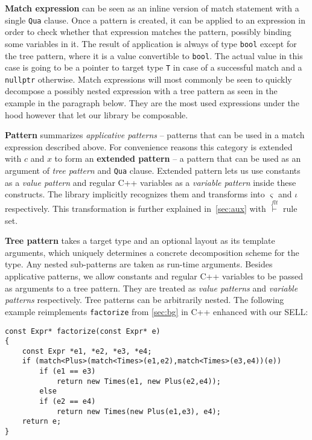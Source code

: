 \documentclass[preprint]{sigplanconf}
\makeatletter
\DeclareRobustCommand{\code}[1]{{\lstinline[breaklines=false,escapechar=@]{#1}}}
\makeatother
\begin{document}
{\bf Match expression} can be seen as an inline version of match statement with 
a single \code{Qua} clause. Once a pattern is created, it can be applied to an 
expression in order to check whether that expression matches the pattern, 
possibly binding some variables in it. The result of application is always of 
type \code{bool} except for the tree pattern, where it is a value convertible to 
\code{bool}. The actual value in this case is going to be a pointer to target 
type \code{T} in case of a successful match and a \code{nullptr} otherwise. 
Match expressions will most commonly be seen to quickly decompose a possibly 
nested expression with a tree pattern as seen in the example in the paragraph 
below. They are the most used expressions under the hood however that let our 
library be composable. 

{\bf Pattern} summarizes \emph{applicative patterns} -- patterns that can be 
used in a match expression described above. For convenience reasons this 
category is extended with $c$ and $x$ to form an {\bf extended pattern} -- a
pattern that can be used as an argument of \emph{tree pattern} and \code{Qua} 
clause. Extended pattern lets us use constants as a \emph{value pattern} and 
regular C++ variables as a \emph{variable pattern} inside these constructs. The 
library implicitly recognizes them and transforms into $\varsigma$ and $\iota$ 
respectively. This transformation is further explained in~\textsection\ref{sec:aux} 
with $\stackrel{flt}{\vdash}$ rule set.

{\bf Tree pattern} takes a target type and an optional layout as its template 
arguments, which uniquely determines a concrete decomposition scheme for the 
type. Any nested sub-patterns are taken as run-time arguments. Besides 
applicative patterns, we allow constants and regular C++ variables to be passed 
as arguments to a tree pattern. They are treated as \emph{value patterns} and 
\emph{variable patterns} respectively. Tree patterns can be arbitrarily nested. 
The following example reimplements \code{factorize} from 
\textsection\ref{sec:bg} in C++ enhanced with our SELL:

\begin{lstlisting}
const Expr* factorize(const Expr* e)
{
    const Expr *e1, *e2, *e3, *e4;
    if (match<Plus>(match<Times>(e1,e2),match<Times>(e3,e4))(e))
        if (e1 == e3)
            return new Times(e1, new Plus(e2,e4));
        else
        if (e2 == e4)
            return new Times(new Plus(e1,e3), e4);
    return e;
}
\end{lstlisting}
\end{document}

